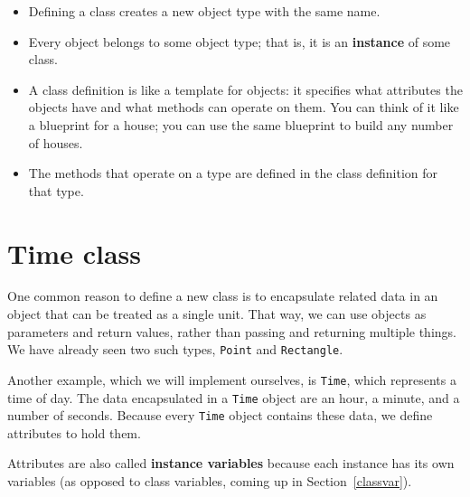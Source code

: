 \documentclass[12pt]{book}
\theoremstyle{exercise}
\newcommand{\java}[1]{\verb"#1"}
\begin{document}
\begin{itemize}

\item Defining a class creates a new object type with the same name.


\item Every object belongs to some object type; that is, it is an {\bf instance} of some class.

\item A class definition is like a template for objects: it specifies what attributes the objects have and what methods can operate on them.
You can think of it like a blueprint for a house; you can use the same blueprint to build any number of houses.

\item The methods that operate on a type are defined in the class definition for that type.


\end{itemize}


\section{Time class}


One common reason to define a new class is to encapsulate related data in an object that can be treated as a single unit.
That way, we can use objects as parameters and return values, rather than passing and returning multiple things.
We have already seen two such types, \java{Point} and \java{Rectangle}.


Another example, which we will implement ourselves, is \java{Time}, which represents a time of day.
The data encapsulated in a \java{Time} object are an hour, a minute, and a number of seconds.
Because every \java{Time} object contains these data, we define attributes to hold them.

Attributes are also called {\bf instance variables} because each instance has its own variables (as opposed to class variables, coming up in Section~\ref{classvar}).
\end{document}
